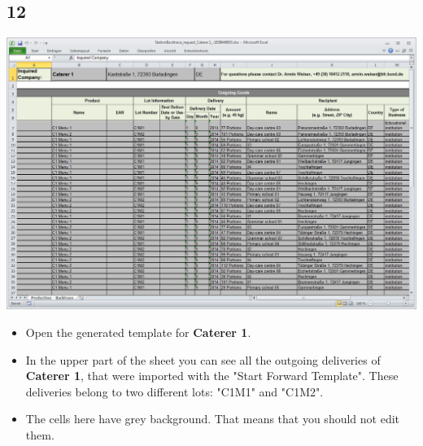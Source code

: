 \documentclass{beamer}
\begin{document}
\subsection{12}
\begin{frame}
	\begin{center}
  		\includegraphics[height=0.55\textwidth]{12.png}
	\end{center}
	\begin{itemize}
		\item Open the generated template for \textbf{Caterer 1}.
		\item In the upper part of the sheet you can see all the outgoing deliveries of \textbf{Caterer 1}, that were imported with the "Start Forward Template". These deliveries belong to two different lots: "C1M1" and "C1M2".
		\item The cells here have grey background. That means that you should not edit them.
	\end{itemize}
\end{frame}
\end{document}
